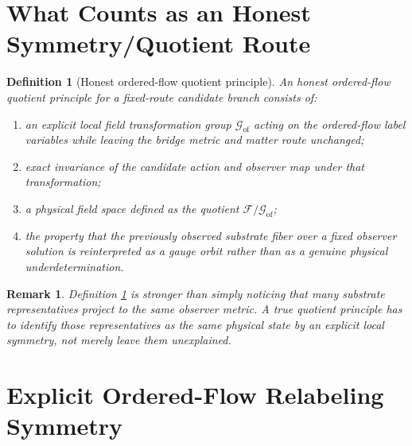 \documentclass[11pt]{article}
\newcommand{\FieldSpace}{\mathscr F}
\newcommand{\GaugeGroup}{\mathscr G_{\mathrm{of}}}
\newtheorem{definition}{Definition}
\newtheorem{remark}{Remark}
\begin{document}
\section{What Counts as an Honest Symmetry/Quotient Route}

\begin{definition}[Honest ordered-flow quotient principle]
\label{def:honest}
An \emph{honest ordered-flow quotient principle} for a fixed-route candidate branch consists of:
\begin{enumerate}
    \item an explicit local field transformation group \(\GaugeGroup\) acting on the ordered-flow label variables while leaving the bridge metric and matter route unchanged;
    \item exact invariance of the candidate action and observer map under that transformation;
    \item a physical field space defined as the quotient \(\FieldSpace/\GaugeGroup\);
    \item the property that the previously observed substrate fiber over a fixed observer solution is reinterpreted as a gauge orbit rather than as a genuine physical underdetermination.
\end{enumerate}
\end{definition}

\begin{remark}
Definition \ref{def:honest} is stronger than simply noticing that many substrate representatives project to the same observer metric. A true quotient principle has to identify those representatives as the same physical state by an explicit local symmetry, not merely leave them unexplained.
\end{remark}

\section{Explicit Ordered-Flow Relabeling Symmetry}
\end{document}
